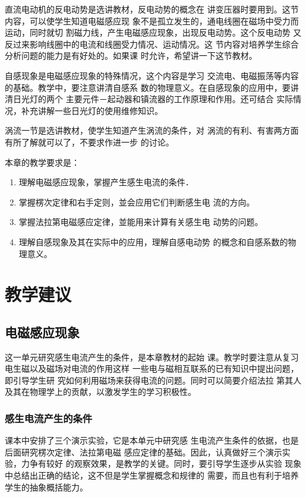 直流电动机的反电动势是选讲教材，反电动势的概念在
讲变压器时要用到。这节内容，可以使学生知道电磁感应现
象不是孤立发生的，通电线圈在磁场中受力而运动，同时就切
割磁力线，产生电磁感应现象，出现反电动势。这个反电动势
又反过来影响线圈中的电流和线圈受力情况、运动情况。这
节内容对培养学生综合分析问题的能力是有好处的。如果课
时允许，希望讲一下这节教材。

自感现象是电磁感应现象的特殊情况，这个内容是学习
交流电、电磁振荡等内容的基础。教学中，要注意讲清自感系
数的物理意义。在自感现象的应用中，要讲清日光灯的两个
主要元件－起动器和镇流器的工作原理和作用。还可结合
实际情况，补充讲解一些日光灯的使用维修知识。

涡流一节是选讲教材，使学生知道产生涡流的条件，对
涡流的有利、有害两方面有所了解就可以了，不要求作进一步
的讨论。

本章的教学要求是：
\begin{enumerate}
\item 理解电磁感应现象，掌握产生感生电流的条件．
\item 掌握楞次定律和右手定则，並会应用它们判断感生电
流的方向。
\item 掌握法拉第电磁感应定律，並能用来计算有关感生电
动势的问题。
\item 理解自感现象及其在实际中的应用，理解自感电动势
的概念和自感系数的物理意义。
\end{enumerate}

\section{教学建议}
\subsection{电磁感应现象}
这一单元研究感生电流产生的条件，是本章教材的起始
课。教学时要注意从复习电生磁以及磁场对电流的作用这样
一些电与磁相互联系的已有知识中提出问题，即引导学生研
究如何利用磁场来获得电流的问题。同时可以简要介绍法拉
第其人及其在物理学上的贡献，以激发学生的学习积极性。

\subsubsection{感生电流产生的条件}
课本中安排了三个演示实验，它是本单元中研究感
生电流产生条件的依据，也是后面研究楞次定律、法拉第电磁
感应定律的基础。因此，认真做好三个演示实验，力争有较好
的观察效果，是教学的关键。同时，要引导学生逐步从实验
现象中总结出正确的结论，这不但是学生掌握概念和规律的
需要，而且也有利于培养学生的抽象概括能力。

